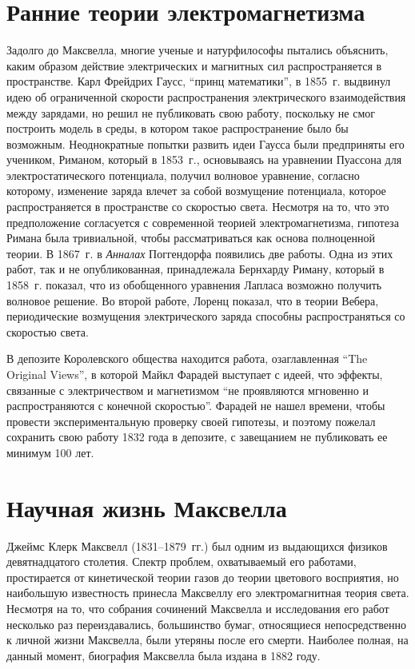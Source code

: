 \documentclass[12pt, oneside, a4paper]{article}
\begin{document}
\section{Ранние теории электромагнетизма}
Задолго до Максвелла, многие ученые и натурфилософы пытались объяснить, каким образом действие электрических и магнитных  сил распространяется в пространстве. Карл Фрейдрих Гаусс, ``принц математики'', в 1855~г. выдвинул идею об ограниченной скорости распространения электрического взаимодействия между зарядами, но решил не публиковать свою работу, поскольку не смог построить модель в среды, в котором такое распространение было бы возможным. Неоднократные попытки развить идеи Гаусса были предприняты его учеником, Риманом, который в 1853~г., основываясь на уравнении Пуассона для электростатического потенциала, получил волновое уравнение, согласно которому, изменение заряда влечет за собой возмущение потенциала, которое распространяется в пространстве со скоростью света. Несмотря на то, что это предположение согласуется с современной теорией электромагнетизма, гипотеза Римана была тривиальной, чтобы рассматриваться как основа полноценной теории. В 1867~г. в \emph{Анналах} Поггендорфа появились две работы. Одна из этих работ, так и не опубликованная, принадлежала Бернхарду Риману, который в 1858~г. показал, что из обобщенного уравнения Лапласа возможно получить волновое решение. Во второй работе, Лоренц показал, что в теории Вебера, периодические возмущения электрического заряда способны распространяться со скоростью света.

В депозите Королевского общества находится работа, озаглавленная ``The Original Views'', в которой Майкл Фарадей выступает с идеей, что эффекты, связанные с электричеством и магнетизмом ``не проявляются мгновенно и распространяются с конечной скоростью''. Фарадей не нашел времени, чтобы провести экспериментальную проверку своей гипотезы, и поэтому пожелал сохранить свою работу 1832 года в депозите, с завещанием не публиковать ее минимум 100 лет.
\section{Научная жизнь Максвелла}
Джеймс Клерк Максвелл (1831--1879~гг.) был одним из выдающихся физиков девятнадцатого столетия. Спектр проблем, охватываемый его работами, простирается от кинетической теории газов до теории цветового восприятия, но наибольшую известность принесла Максвеллу его электромагнитная теория света. Несмотря на то, что собрания сочинений Максвелла и исследования его работ несколько раз переиздавались, большинство бумаг, относящиеся непосредственно к личной жизни Максвелла, были утеряны после его смерти. Наиболее полная, на данный момент, биография Максвелла была издана в 1882 году.
\end{document}
